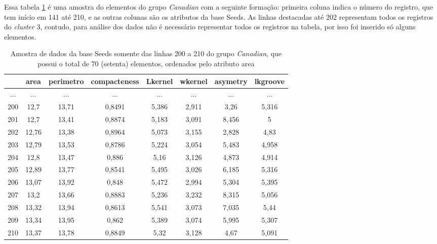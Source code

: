 Essa tabela \ref{tab:analise:seeds:cluster3} é uma amostra do elementos do grupo \textit{Canadian} com a seguinte formação: primeira coluna indica o número do registro, que tem início em 141 até 210, e as outras colunas são os atributos da base Seeds. As linhas destacadas até 202 representam  todos os registros do \textit{cluster} 3,  contudo, para análise dos dados não é necessário representar todos os registros na tabela, por isso foi inserido só alguns elementos.

\begin{table}[!ht]
\caption{Amostra de dados da base Seeds somente das linhas 200 a 210 do grupo \textit{Canadian}, que possui o total de 70 (setenta) elementos, ordenados pelo atributo area}
\centering
 
   \begin{tabular}{|c|c|c|c|c|c|c|c|}
\hline

& \textbf{area} & \textbf{perimetro} & compacteness & Lkernel & wkernel & asymetry &lkgroove \\ \hline
\rowcolor[HTML]{EFEFEF}
...& ... & ... & ... & ... & ... & ... & ...\\ \hline 
\rowcolor[HTML]{EFEFEF}
200 & 12,7 & 13,71 & 0,8491 & 5,386 & 2,911 & 3,26 & 5,316\\ \hline
\rowcolor[HTML]{EFEFEF}
201 & 12,7 & 13,41 & 0,8874 & 5,183 & 3,091 & 8,456 & 5\\ \hline
\rowcolor[HTML]{EFEFEF}
202 & 12,76 & 13,38 & 0,8964 & 5,073 & 3,155 & 2,828 & 4,83\\ \hline
203 & 12,79 & 13,53 & 0,8786 & 5,224 & 3,054 & 5,483 & 4,958\\ \hline
204 & 12,8 & 13,47 & 0,886 & 5,16 & 3,126 & 4,873 & 4,914\\ \hline
205 & 12,89 & 13,77 & 0,8541 & 5,495 & 3,026 & 6,185 & 5,316\\ \hline
206 & 13,07 & 13,92 & 0,848 & 5,472 & 2,994 & 5,304 & 5,395\\ \hline
207 & 13,2 & 13,66 & 0,8883 & 5,236 & 3,232 & 8,315 & 5,056\\ \hline
208 & 13,32 & 13,94 & 0,8613 & 5,541 & 3,073 & 7,035 & 5,44\\ \hline
209 & 13,34 & 13,95 & 0,862 & 5,389 & 3,074 & 5,995 & 5,307\\ \hline
210 & 13,37 & 13,78 & 0,8849 & 5,32 & 3,128 & 4,67 & 5,091\\ \hline

\end{tabular}
 
    
 \label{tab:analise:seeds:cluster3}
\end{table}

